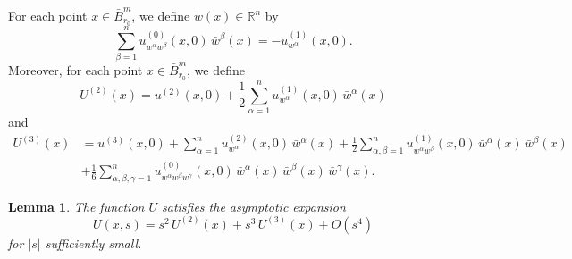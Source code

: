 \documentclass[11pt]{amsart}
\newtheorem{lemma}[theorem]{Lemma}
\theoremstyle{definition}
\begin{document}
For each point $x \in \bar{B}_{r_0}^m$, we define $\bar{w}(x) \in \mathbb{R}^n$ by 
\begin{equation} 
\label{definition.of.bar.w}
\sum_{\beta=1}^n u^{(0)}_{w^\alpha w^\beta}(x,0) \, \bar{w}^\beta(x) = -u^{(1)}_{w^\alpha}(x,0). 
\end{equation}
Moreover, for each point $x \in \bar{B}_{r_0}^m$, we define 
\[U^{(2)}(x) = u^{(2)}(x,0) + \frac{1}{2} \sum_{\alpha=1}^n u^{(1)}_{w^\alpha}(x,0) \, \bar{w}^\alpha(x)\] 
and 
\begin{align*} 
U^{(3)}(x) 
&= u^{(3)}(x,0) + \sum_{\alpha=1}^n u^{(2)}_{w^\alpha}(x,0) \, \bar{w}^\alpha(x) + \frac{1}{2} \sum_{\alpha,\beta=1}^n u^{(1)}_{w^\alpha w^\beta}(x,0) \, \bar{w}^\alpha(x) \, \bar{w}^\beta(x) \\ 
&+ \frac{1}{6} \sum_{\alpha,\beta,\gamma=1}^n u^{(0)}_{w^\alpha w^\beta w^\gamma}(x,0) \, \bar{w}^\alpha(x) \, \bar{w}^\beta(x) \, \bar{w}^\gamma(x). 
\end{align*} 

\begin{lemma}
\label{asymptotic.expansion.of.U}
The function $U$ satisfies the asymptotic expansion 
\[U(x,s) = s^2 \, U^{(2)}(x) + s^3 \, U^{(3)}(x) + O(s^4)\] 
for $|s|$ sufficiently small.
\end{lemma}
\end{document}

